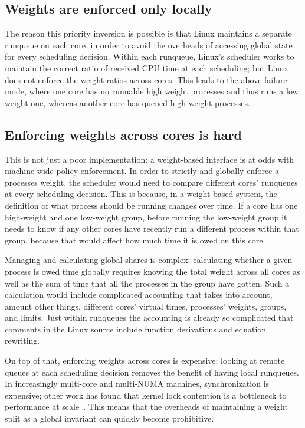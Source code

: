 \subsection{Weights are enforced only locally}\label{ss:problem:weights-local}

The reason this priority inversion is possible is that Linux maintains a
separate runqueue on each core, in order to avoid the overheads of accessing
global state for every scheduling decision. Within each runqueue, Linux's
scheduler works to maintain the correct ratio of received CPU time at each
scheduling; but Linux does not enforce the weight ratios across cores. This
leads to the above failure mode, where one core has no runnable high weight
processes and thus runs a low weight one, whereas another core has queued high
weight processes.

\subsection{Enforcing weights across cores is
hard}\label{ss:problem:cross-core-hard}

This is not just a poor implementation: a weight-based interface is at odds with
machine-wide policy enforcement. In order to strictly and globally enforce a
processes weight, the scheduler would need to compare different cores' runqueues
at every scheduling decision. This is because, in a weight-based system, the
definition of what process should be running changes over time. If a core has
one high-weight and one low-weight group, before running the low-weight group it
needs to know if any other cores have recently run a different process within
that group, because that would affect how much time it is owed on this core.

Managing and calculating global shares is complex: calculating whether a given
process is owed time globally requires knowing the total weight across all cores
as well as the sum of time that all the processes in the group have gotten. Such
a calculation would include complicated accounting that takes into account,
amount other things, different cores' virtual times, processes' weights, groups,
and limits. Just within runqueues the accounting is already so complicated that
comments in the Linux source include function derivations and equation
rewriting.

On top of that, enforcing weights across cores is expensive: looking at remote
queues at each scheduling decision removes the benefit of having local
runqueues. In increasingly multi-core and multi-NUMA machines, synchronization
is expensive; other work has found that kernel lock contention is a bottleneck
to performance at scale~\cite{afaas}. This means that the overheads of
maintaining a weight split as a global invariant can quickly become prohibitive.


